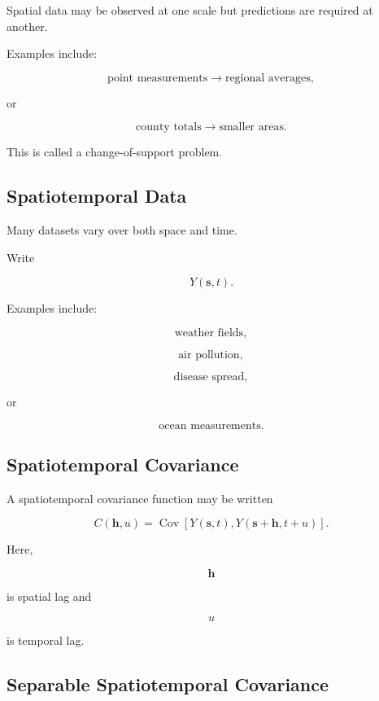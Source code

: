 Spatial data may be observed at one scale but predictions are required at
another.

Examples include:

\[
\boxed{
\text{point measurements}
\rightarrow
\text{regional averages},
}
\]

or

\[
\boxed{
\text{county totals}
\rightarrow
\text{smaller areas}.
}
\]

This is called a change-of-support problem.

\subsection{Spatiotemporal Data}
\label{subsec:spatiotemporal-data}

Many datasets vary over both space and time.

Write

\[
\boxed{
Y(\mathbf{s},t).
}
\]

Examples include:

\[
\boxed{
\text{weather fields},
}
\]

\[
\boxed{
\text{air pollution},
}
\]

\[
\boxed{
\text{disease spread},
}
\]

or

\[
\boxed{
\text{ocean measurements}.
}
\]

\subsection{Spatiotemporal Covariance}
\label{subsec:spatiotemporal-covariance}

A spatiotemporal covariance function may be written

\[
\boxed{
C
(
\mathbf{h},
u
)
=
\operatorname{Cov}
[
Y(\mathbf{s},t),
Y(\mathbf{s}+\mathbf{h},t+u)
].
}
\]

Here,

\[
\mathbf{h}
\]

is spatial lag and

\[
u
\]

is temporal lag.

\subsection{Separable Spatiotemporal Covariance}
\label{subsec:separable-spatiotemporal-covariance}

